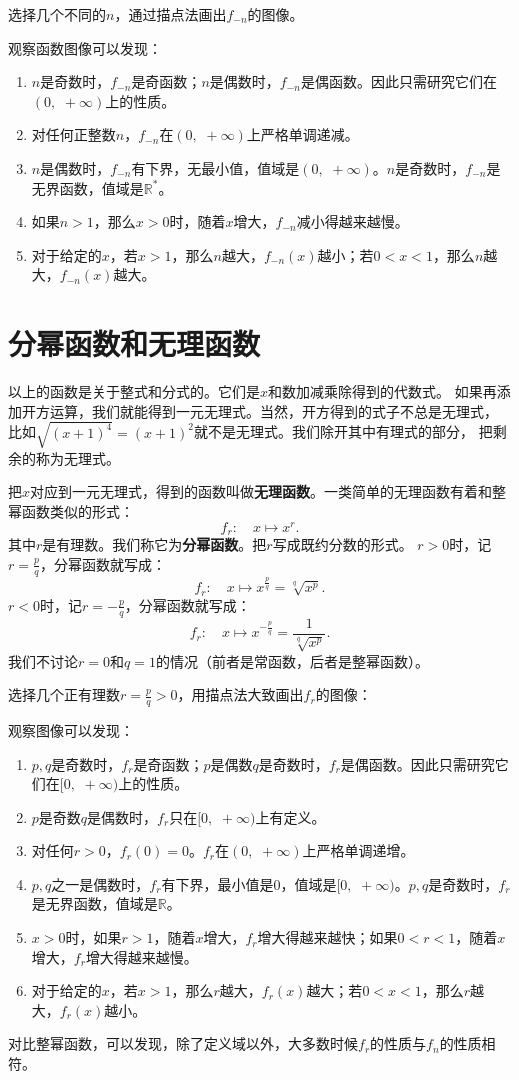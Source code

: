 \documentclass[12pt,UTF8]{ctexbook}
\begin{document}
选择几个不同的$n$，通过描点法画出$f_{-n}$的图像。


观察函数图像可以发现：
\begin{enumerate}
    \item $n$是奇数时，$f_{-n}$是奇函数；$n$是偶数时，$f_{-n}$是偶函数。因此只需研究它们在$(0, \,\, +\infty)$上的性质。
    \item 对任何正整数$n$，$f_{-n}$在$(0, \,\, +\infty)$上严格单调递减。
    \item $n$是偶数时，$f_{-n}$有下界，无最小值，值域是$(0, \,\, +\infty)$。$n$是奇数时，$f_{-n}$是无界函数，值域是$\mathbb{R}^*$。
    \item 如果$n>1$，那么$x>0$时，随着$x$增大，$f_{-n}$减小得越来越慢。
    \item 对于给定的$x$，若$x>1$，那么$n$越大，$f_{-n}(x)$越小；若$0 < x<1$，那么$n$越大，$f_{-n}(x)$越大。
\end{enumerate}

\section{分幂函数和无理函数}
以上的函数是关于整式和分式的。它们是$x$和数加减乘除得到的代数式。
如果再添加开方运算，我们就能得到一元无理式。当然，开方得到的式子不总是无理式，
比如$\sqrt{(x+1)^4} = (x+1)^2$就不是无理式。我们除开其中有理式的部分，
把剩余的称为无理式。

把$x$对应到一元无理式，得到的函数叫做\textbf{无理函数}。一类简单的无理函数有着和整幂函数类似的形式：
$$ f_r : \quad x \mapsto x^r. $$
其中$r$是有理数。我们称它为\textbf{分幂函数}。把$r$写成既约分数的形式。
$r > 0$时，记$r = \frac{p}{q}$，分幂函数就写成：
$$ f_r : \quad x \mapsto x^\frac{p}{q} = \sqrt[q]{x^p}. $$
$r < 0$时，记$r = -\frac{p}{q}$，分幂函数就写成：
$$ f_r : \quad x \mapsto x^{-\frac{p}{q}} = \frac{1}{\sqrt[q]{x^p}} . $$
我们不讨论$r=0$和$q=1$的情况（前者是常函数，后者是整幂函数）。

选择几个正有理数$r = \frac{p}{q} > 0$，用描点法大致画出$f_r$的图像：


观察图像可以发现：
\begin{enumerate}
    \item $p, q$是奇数时，$f_r$是奇函数；$p$是偶数$q$是奇数时，$f_r$是偶函数。因此只需研究它们在$[0, \,\, +\infty)$上的性质。
    \item $p$是奇数$q$是偶数时，$f_r$只在$[0,\,\,  +\infty)$上有定义。
    \item 对任何$r > 0$，$f_r(0) = 0$。$f_r$在$(0, \,\, +\infty)$上严格单调递增。
    \item $p, q$之一是偶数时，$f_r$有下界，最小值是$0$，值域是$[0, \,\, +\infty)$。$p, q$是奇数时，$f_r$是无界函数，值域是$\mathbb{R}$。
    \item $x>0$时，如果$r>1$，随着$x$增大，$f_r$增大得越来越快；如果$0 < r < 1$，随着$x$增大，$f_r$增大得越来越慢。
    \item 对于给定的$x$，若$x>1$，那么$r$越大，$f_r(x)$越大；若$0 < x<1$，那么$r$越大，$f_r(x)$越小。
\end{enumerate}
对比整幂函数，可以发现，除了定义域以外，大多数时候$f_r$的性质与$f_n$的性质相符。
\end{document}
